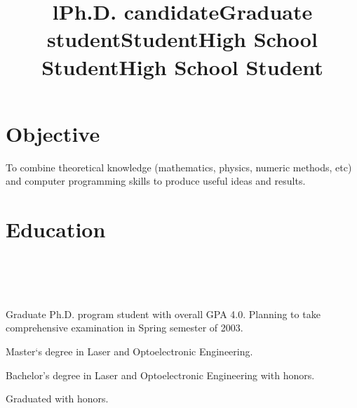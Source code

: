 \documentclass[10pt,overlapped,line]{res}
\begin{document}
\begin{resume}

\section{Objective} 
To combine theoretical knowledge (mathematics, physics, numeric
methods, etc) and computer programming skills to produce useful ideas
and results. 
   
\section{Education}
\begin{format}
  \title{l}\\
  \\
  \body\\
\end{format}

\title{Ph.D. candidate}
\begin{position}
  Graduate Ph.D. program student with overall GPA 4.0. Planning to
take comprehensive examination in Spring semester of 2003.
\end{position}

\title{Graduate student}
\begin{position}
 Master`s degree in Laser and Optoelectronic Engineering.
\end{position}

\title{Student}
\begin{position}
 Bachelor's degree in Laser and Optoelectronic Engineering with
 honors.
\end{position}

\title{High School Student}
\begin{position}
 Graduated with honors.
\end{position}

\title{High School Student}
\begin{position}
\end{position}



\end{resume}
\end{document}

